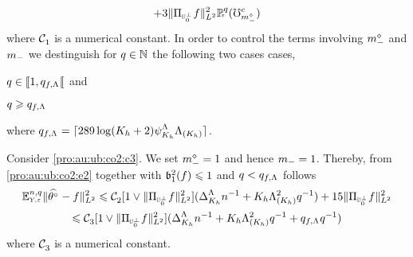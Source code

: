 \begin{pro}
\begin{multline}
+3
\VnormLp{\Proj[{\mHiH[0]^\perp}]\xdf}^2\FuVg[\ssE]{\rE}(\aixEv[\mdDi]^c)
  \end{multline}
where $\cst{1}$ is a numerical constant.  In order to control the terms
involving $\mdDi$ and $\mDi$ we destinguish for $\ssE\in\Nz$ the following two cases
cases, \begin{inparaenum}[i]\renewcommand{\theenumi}{\dgrau\rm(b-\roman{enumi})}\item\label{pro:au:ub:co2:c3}
$\ssE\in\nsetro{1,\ssE_{\xdf,\iSv}}$ and \item\label{pro:au:ub:co2:c4}
$\ssE\geq\ssE_{\xdf,\iSv}$ \end{inparaenum}
where $\ssE_{\xdf,\iSv}=\ceil{289\log(K_{\ydf}+2)\cmiSv[K_{\ydf}]\miSv[K_{\ydf}]}$.
   
Consider \ref{pro:au:ub:co2:c3}. We set $\mdDi=1$ and hence
$\mDi=1$. Thereby, from \eqref{pro:au:ub:co2:e2} together with
$\bias[1]^2(\xdf)\leq1$ and $\ssE<\ssE_{\xdf,\iSv}$ follows
\begin{multline}\label{pro:au:ub:co2:e3}
\FuEx[\ssY,\ssE]{\rY,\rE}\VnormLp{\hxdfPr[]-\xdf}^2
\leq\cst{2}[1\vee\VnormLp{\Proj[{\mHiH[0]^\perp}]\xdf}^2](\DipenSv[K_{\ydf}]\ssY^{-1}+K_{\ydf}\miSv[K_{\ydf}]^2\ssE^{-1})+15\VnormLp{\Proj[{\mHiH[0]^\perp}]\xdf}^2\\
\leq\cst{3}[1\vee\VnormLp{\Proj[{\mHiH[0]^\perp}]\xdf}^2](\DipenSv[K_{\ydf}]\ssY^{-1}+K_{\ydf}\miSv[K_{\ydf}]^2\ssE^{-1}+\ssE_{\xdf,\iSv}\ssE^{-1})
  \end{multline}
where $\cst{3}$ is a numerical constant.


\end{pro}
